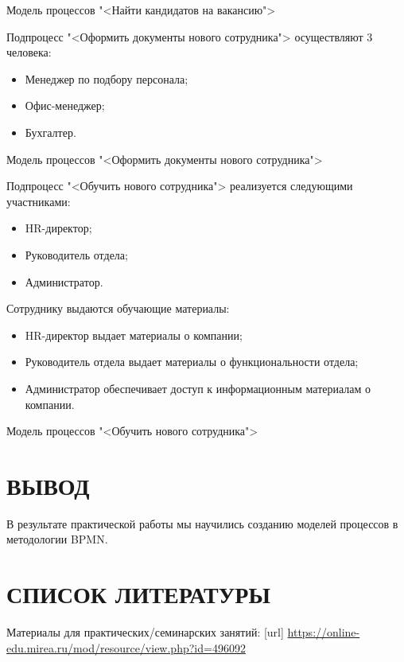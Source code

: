 \begin{image}
	\caption{Модель процессов "<Найти кандидатов на вакансию">}
\end{image}

Подпроцесс "<Оформить документы нового сотрудника"> осуществляют 3
человека:

\begin{itemize}
	\item Менеджер по подбору персонала;
	\item Офис-менеджер;
	\item Бухгалтер.
\end{itemize}

\begin{image}
	\caption{Модель процессов "<Оформить документы нового сотрудника">}
\end{image}


Подпроцесс "<Обучить нового сотрудника"> реализуется следующими
участниками:

\begin{itemize}
	\item HR-директор;
	\item Руководитель отдела;
	\item Администратор.
\end{itemize}

Сотруднику выдаются обучающие материалы:

\begin{itemize}
	\item HR-директор выдает материалы о компании;
	\item Руководитель отдела выдает материалы о функциональности отдела;
	\item Администратор обеспечивает доступ к информационным материалам о
	компании.
\end{itemize}

\begin{image}
	\caption{Модель процессов "<Обучить нового сотрудника">}
\end{image}

\clearpage

\section*{ВЫВОД}
В результате практической работы  мы научились
созданию моделей процессов в методологии BPMN.

\clearpage

\section*{СПИСОК ЛИТЕРАТУРЫ}
\begin{thebibliography}{}
	\bibitem{}  Материалы для практических/семинарских занятий: [url]
	\url{https://online-edu.mirea.ru/mod/resource/view.php?id=496092}
\end{thebibliography}
